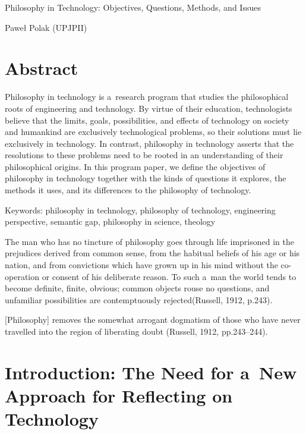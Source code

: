 \setcounter{secnumdepth}{0}







Philosophy in Technology: Objectives, Questions, Methods, and Issues





Paweł Polak (UPJPII)



\section{Abstract}

Philosophy in technology is a~research program that studies the philosophical roots of engineering and technology. By virtue of their education, technologists believe that the limits, goals, possibilities, and effects of technology on society and humankind are exclusively technological problems, so their solutions must lie exclusively in technology. In contrast, philosophy in technology asserts that the resolutions to these problems need to be rooted in an understanding of their philosophical origins. In this program paper, we define the objectives of philosophy in technology together with the kinds of questions it explores, the methods it uses, and its differences to the philosophy of technology.



Keywords: philosophy in technology, philosophy of technology, engineering perspective, semantic gap, philosophy in science, theology



The man who has no tincture of philosophy goes through life imprisoned in the prejudices derived from common sense, from the habitual beliefs of his age or his nation, and from convictions which have grown up in his mind without the co-operation or consent of his deliberate reason. To such a~man the world tends to become definite, finite, obvious; common objects rouse no questions, and unfamiliar possibilities are contemptuously rejected\label{ref:RNDJ0Uq3xFY8B}\textup{(Russell, 1912, p.243)}\textup{.}



[Philosophy] removes the somewhat arrogant dogmatism of those who have never travelled into the region of liberating doubt \label{ref:RNDiWmEalmrpO}\textup{(Russell, 1912, pp.243–244)}.



\section{Introduction: The Need for a~New Approach for Reflecting on Technology}


